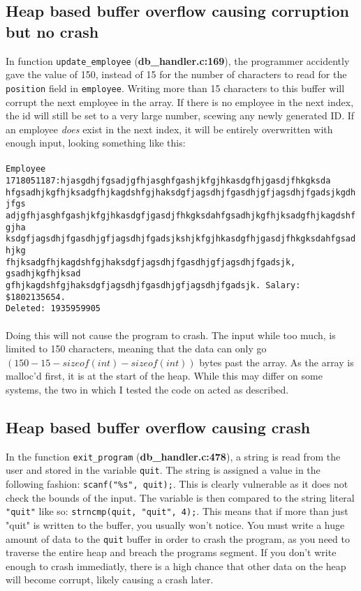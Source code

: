 \documentclass[]{article}
\begin{document}
\subsection*{Heap based buffer overflow causing corruption but no crash}
In function \texttt{update\_employee} (\textbf{db\_handler.c:169}), the programmer accidently gave the value of 150, instead of 15 for the number of characters to read for the \texttt{position} field in \texttt{employee}.
Writing more than 15 characters to this buffer will corrupt the next employee in the array. If there is no employee in the next index, the id will still be set to a very large number, scewing any newly generated ID.
If an employee \textit{does} exist in the next index, it will be entirely overwritten with enough input, looking 
something like this:
\\
\\
 \texttt{Employee 1718051187:hjasgdhjfgsadjgfhjasghfgashjkfgjhkasdgfhjgasdjfhkgksda\\
 	hfgsadhjkgfhjksadgfhjkagdshfgjhaksdgfjagsdhjfgasdhjgfjagsdhjfgadsjkgdhjfgs\\
 	adjgfhjasghfgashjkfgjhkasdgfjgasdjfhkgksdahfgsadhjkgfhjksadgfhjkagdshfgjha\\
 	ksdgfjagsdhjfgasdhjgfjagsdhjfgadsjkshjkfgjhkasdgfhjgasdjfhkgksdahfgsadhjkg\\
 	fhjksadgfhjkagdshfgjhaksdgfjagsdhjfgasdhjgfjagsdhjfgadsjk, gsadhjkgfhjksad\\
 	gfhjkagdshfgjhaksdgfjagsdhjfgasdhjgfjagsdhjfgadsjk. Salary: \$1802135654. \\
 	Deleted: 1935959905}
 \\
 \\
Doing this will not cause the program to crash. The input while too much, is limited to 150 characters, meaning that the data can only go $(150 - 15 - sizeof(int) - sizeof(int))$ bytes past the array. As the array is malloc'd first, it is at the start of the heap. While this may differ on some systems, the two in which I tested the code on acted as described. 

\subsection*{Heap based buffer overflow causing crash}
In the function \texttt{exit\_program} (\textbf{db\_handler.c:478}), a string is read from the user and stored in the variable \texttt{quit}. The string is assigned a value in the following fashion: \texttt{scanf("\%s", quit);}. This is clearly vulnerable as it does not check the bounds of the input. The variable is then compared to the string literal \texttt{"quit"} like so: \texttt{strncmp(quit, "quit", 4);}. This means that if more than just "quit" is written to the buffer, you usually won't notice. You must write a huge amount of data to the \texttt{quit} buffer in order to crash the program, as you need to traverse the entire heap and breach the programs segment. If you don't write enough to crash immediatly, there is a high chance that other data on the heap will become corrupt, likely causing a crash later.
\end{document}
